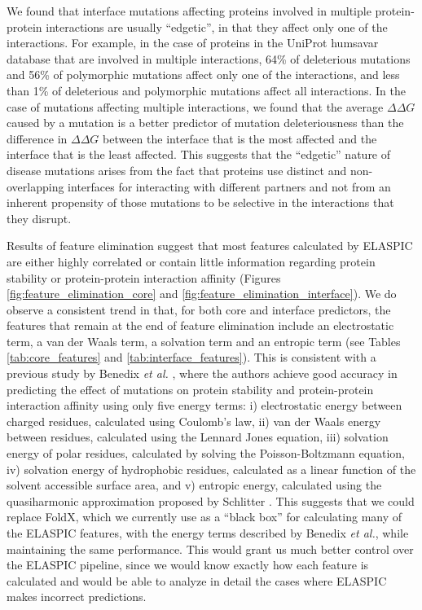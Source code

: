We found that interface mutations affecting proteins involved in multiple protein-protein interactions are usually ``edgetic'', in that they affect only one of the interactions. For example, in the case of proteins in the UniProt humsavar database that are involved in multiple interactions, 64\% of deleterious mutations and 56\% of polymorphic mutations affect only one of the interactions, and less than 1\% of deleterious and polymorphic mutations affect all interactions. In the case of mutations affecting multiple interactions, we found that the average $\Delta \Delta G$ caused by a mutation is a better predictor of mutation deleteriousness than the difference in $\Delta \Delta G$ between the interface that is the most affected and the interface that is the least affected. This suggests that the ``edgetic'' nature of disease mutations \cite{sahni_widespread_2015} arises from the fact that proteins use distinct and non-overlapping interfaces for interacting with different partners and not from an inherent propensity of those mutations to be selective in the interactions that they disrupt.

Results of feature elimination suggest that most features calculated by ELASPIC are either highly correlated or contain little information regarding protein stability or protein-protein interaction affinity (Figures \ref{fig:feature_elimination_core} and \ref{fig:feature_elimination_interface}). We do observe a consistent trend in that, for both core and interface predictors, the features that remain at the end of feature elimination include an electrostatic term, a van der Waals term, a solvation term and an entropic term (see Tables \ref{tab:core_features} and \ref{tab:interface_features}). This is consistent with a previous study by Benedix \textit{et al.} \cite{benedix_predicting_2009}, where the authors achieve good accuracy in predicting the effect of mutations on protein stability and protein-protein interaction affinity using only five energy terms: i) electrostatic energy between charged residues, calculated using Coulomb's law, ii) van der Waals energy between residues, calculated using the Lennard Jones equation, iii) solvation energy of polar residues, calculated by solving the Poisson-Boltzmann equation, iv) solvation energy of hydrophobic residues, calculated as a linear function of the solvent accessible surface area, and v) entropic energy, calculated using the quasiharmonic approximation proposed by Schlitter \cite{schlitter_estimation_1993}. This suggests that we could replace FoldX, which we currently use as a ``black box'' for calculating many of the ELASPIC features, with the energy terms described by Benedix \textit{et al.}, while maintaining the same performance. This would grant us much better control over the ELASPIC pipeline, since we would know exactly how each feature is calculated and would be able to analyze in detail the cases where ELASPIC makes incorrect predictions.

